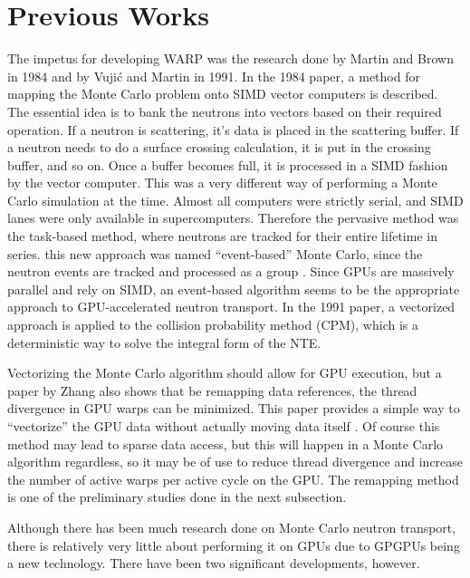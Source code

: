 
\section{Previous Works}

The impetus for developing WARP was the research done by Martin and Brown in 1984 and by Vuji\'{c} and Martin in 1991.  In the 1984 paper, a method for mapping the Monte Carlo problem onto SIMD vector computers is described.  The essential idea is to bank the neutrons into vectors based on their required operation.  If a neutron is scattering, it's data is placed in the scattering buffer.  If a neutron needs to do a surface crossing calculation, it is put in the crossing buffer, and so on.  Once a buffer becomes full, it is processed in a SIMD fashion by the vector computer.  This was a very different way of performing a Monte Carlo simulation at the time.  Almost all computers were strictly serial, and SIMD lanes were only available in supercomputers.  Therefore the pervasive method was the task-based method, where neutrons are tracked for their entire lifetime in series.  this new approach was named ``event-based'' Monte Carlo, since the neutron events are tracked and processed as a group \cite{vector}.  Since GPUs are massively parallel and rely on SIMD, an event-based algorithm seems to be the appropriate approach to GPU-accelerated neutron transport.  In the 1991 paper, a vectorized approach is applied to the collision probability method (CPM), which is a deterministic way to solve the integral form of the NTE. \cite{vujic_vector}

Vectorizing the Monte Carlo algorithm should allow for GPU execution, but a paper by Zhang also shows that be remapping data references, the thread divergence in GPU warps can be minimized.  This paper provides a simple way to ``vectorize'' the GPU data without actually moving data itself \cite{on_the_fly_remapping}.  Of course this method may lead to sparse data access, but this will happen in a Monte Carlo algorithm regardless, so it may be of use to reduce thread divergence and increase the number of active warps per active cycle on the GPU.  The remapping method is one of the preliminary studies done in the next subsection.

Although there has been much research done on Monte Carlo neutron transport, there is relatively very little about performing it on GPUs due to GPGPUs being a new technology.  There have been two significant developments, however.  

